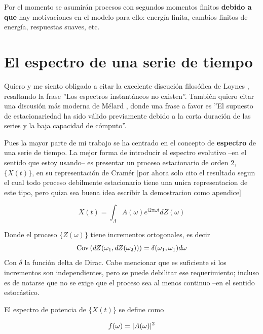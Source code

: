 Por el momento se asumir\'an procesos con segundos momentos finitos 
\textbf{debido a que} hay motivaciones
en el modelo para ello: energ\'ia finita, cambios finitos de energ\'ia, respuestas suaves, etc.


\section{El espectro de una serie de tiempo}

Quiero y me siento obligado a citar la excelente discuci\'on
filos\'ofica
de Loynes \cite{Loynes68}, resaltando la frase ''Los espectros instant\'aneos no existen''.
Tambi\'en quiero citar una discusi\'on m\'as moderna de M\'elard \cite{Melard89}, donde una
frase a favor es ''El supuesto de estacionariedad ha sido v\'alido previamente debido a la corta
duraci\'on de las series y la baja capacidad de c\'omputo''.

Pues la mayor parte de mi trabajo se ha centrado en el concepto de \textbf{espectro} de una serie
de tiempo. La mejor forma de introducir el espectro evolutivo 
--en el sentido que estoy usando-- es
presentar un proceso estacionario de orden 2,
 $\{X(t)\}$, en su representaci\'on de Cram\'er \cite{Priestley81}
[por ahora solo cito el resultado segun el cual todo proceso debilmente estacionario
tiene una unica representacion de este tipo, pero quiza sea buena idea escribir la demostracion
como apendice]

\begin{equation*}
X(t) = \int_{\Lambda} A(\omega) e^{i 2\pi \omega t} dZ(\omega)
\end{equation*}

Donde el proceso $\{ Z(\omega) \}$ tiene incrementos ortogonales, es decir 
\begin{equation*}
\mathrm{Cov}\left( dZ(\omega_1,dZ(\omega_2)) \right) = \delta(\omega_1,\omega_1) d\omega
\end{equation*}
Con $\delta$ la funci\'on delta de Dirac. Cabe mencionar que es suficiente si los incrementos
son independientes, pero se puede debilitar ese requerimiento; incluso es de notarse que no
se exige que el proceso sea al menos continuo --en el sentido estoc\'astico.

El espectro de potencia de $\{X(t)\}$ se define como

\begin{equation*}
f(\omega) = \lvert A(\omega) \rvert^{2}
\end{equation*}

